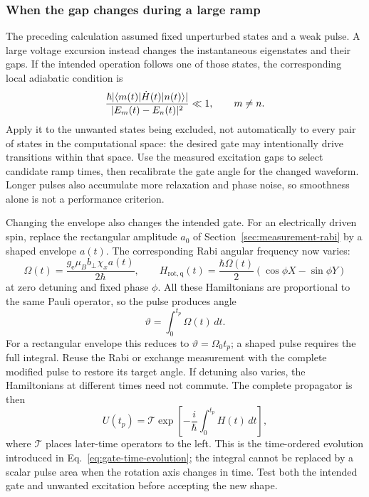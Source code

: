 \subsubsection{When the gap changes during a large ramp}
The preceding calculation assumed fixed unperturbed states and a
weak pulse. A large voltage excursion instead changes the
instantaneous eigenstates and their gaps. If the intended operation
follows one of those states,
the corresponding local adiabatic condition is
\begin{equation}
 \frac{\hbar|\bra{m(t)}\dot H(t)\ket{n(t)}|}
      {|E_m(t)-E_n(t)|^2}\ll1,\qquad m\ne n.
 \label{eq:calibration-adiabatic-condition}
\end{equation}
Apply it to the unwanted states being excluded, not automatically
to every pair of states in the computational space: the desired
gate may intentionally drive transitions within that space.
Use the measured excitation gaps to select candidate ramp times,
then recalibrate the gate angle for the changed waveform.
Longer pulses also accumulate more relaxation and phase noise,
so smoothness alone is not a performance criterion.

Changing the envelope also changes the intended gate.
For an electrically driven spin, replace the rectangular amplitude
$a_0$ of Section~\ref{sec:measurement-rabi} by a shaped
envelope $a(t)$. The corresponding Rabi angular frequency now varies:
\[
 \Omega(t)=\frac{g_{\mathrm e}\mu_Bb_\perp\chi_x a(t)}{2\hbar},
 \qquad
 H_{\mathrm{rot,q}}(t)
 =\frac{\hbar\Omega(t)}2(\cos\phi X-\sin\phi Y)
\]
at zero detuning and fixed phase $\phi$.
All these Hamiltonians are proportional to the same Pauli operator,
so the pulse produces angle
\[
 \vartheta=\int_0^{t_p}\Omega(t)\,dt.
\]
For a rectangular envelope this reduces to $\vartheta=\Omega_0t_p$;
a shaped pulse requires the full integral.
Reuse the Rabi or exchange measurement with the complete modified
pulse to restore its target angle. If detuning also varies, the
Hamiltonians at different times need not commute. The complete
propagator is then
\begin{equation}
 U(t_p)=\mathcal T\exp\!\left[-\frac{i}{\hbar}
                    \int_0^{t_p}H(t)\,dt\right],
 \label{eq:calibration-shaped-time-ordering}
\end{equation}
where $\mathcal T$ places later-time operators to the left. This is
the time-ordered evolution introduced in
Eq.~\eqref{eq:gate-time-evolution}; the integral cannot be replaced
by a scalar pulse area when the rotation axis changes in time.
Test both the intended gate and unwanted excitation before accepting
the new shape.
